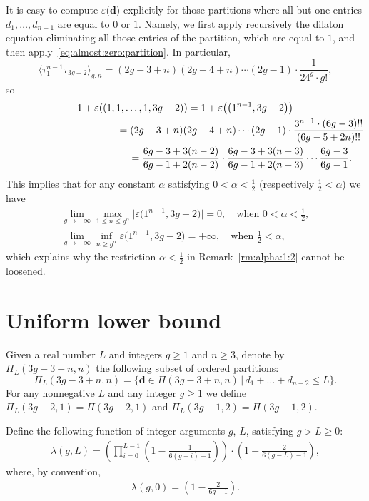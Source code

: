 \documentclass[pdftex]{sigma}
\renewcommand{\epsilon}{\varepsilon}
\theoremstyle{definition}
\begin{document}
It is easy to compute $\epsilon\big(\boldsymbol{d}\big)$
explicitly for those partitions where all but one entries
$d_1,\dots,d_{n-1}$ are equal to $0$ or $1$. Namely,
we first apply recursively
the dilaton equation eliminating all those entries of the
partition, which are equal to $1$, and then apply~\eqref{eq:almost:zero:partition}.
In particular,
\[
\big\langle\tau_1^{n-1}\tau_{3g-2}\big\rangle_{g,n} =(2g-3+n)(2g-4+n)\cdots(2g-1)\cdot\frac{1}{24^g\cdot g!} ,
\]
so
\begin{gather*}
1+\epsilon ((1,1,\dots,1,3g-2) )=1+\epsilon\big(\big(1^{n-1},3g-2\big)\big)
 \\
 \hphantom{1+\epsilon ((1,1,\dots,1,3g-2) )}{} =
(2g-3+n)(2g-4+n)\cdots(2g-1)\cdot\frac{3^{n-1}\cdot(6g-3)!!}{(6g-5+2n)!!} \\
 \hphantom{1+\epsilon ((1,1,\dots,1,3g-2) )}{} =
\frac{6g-3+3(n-2)}{6g-1+2(n-2)}\cdot\frac{6g-3+3(n-3)}{6g-1+2(n-3)}\cdots\frac{6g-3}{6g-1} .
\end{gather*}
This implies that
for any constant $\alpha$ satisfying $0<\alpha<\frac{1}{2}$
(respectively $\frac{1}{2}<\alpha$)
we have
\begin{gather*}
\lim_{g\to+\infty}\max_{1\le n \le g^\alpha}
\big|\epsilon\big(1^{n-1},3g-2\big)\big|=
0, \quad \text{when }0<\alpha<\frac{1}{2} ,
\\
\lim_{g\to+\infty}\inf_{n \ge g^\alpha}
\epsilon\big(1^{n-1},3g-2\big)=
+\infty, \quad \text{when }\frac{1}{2}<\alpha ,
\end{gather*}
which explains why the restriction $\alpha<\frac{1}{2}$ in Remark~\ref{rm:alpha:1:2} cannot be loosened.

\section{Uniform lower bound}\label{s:Uniform:lower:bound}

Given a real
number $L$ and integers $g\ge 1$ and $n\ge 3$, denote
by $\Pi_L(3g-3+n,n)$ the following subset
of ordered partitions:
\[
\Pi_L(3g-3+n,n)=\big\{\boldsymbol{d}\in\Pi(3g-3+n,n) \,\big|\, d_1+\dots+d_{n-2} \le L \big\} .
\]
For any nonnegative $L$ and any integer $g\ge 1$ we define
$\Pi_L(3g-2,1)=\Pi(3g-2,1)$ and
$\Pi_L(3g-1,2)=\Pi(3g-1,2)$.

Define the following function of integer arguments $g$, $L$, satisfying $g>L\ge 0$:
\begin{gather}
\label{eq:lambda}
\lambda(g,L)=\left(\prod_{i=0}^{L-1}\left(1-\frac{1}{6(g-i)+1}\right)\right)
\cdot\left(1-\frac{2}{6(g-L)-1}\right) ,
\end{gather}
where, by convention,
\begin{gather}
\label{eq:lambda:0}
\lambda(g,0)=\left(1-\frac{2}{6g-1}\right) .
\end{gather}
\end{document}
